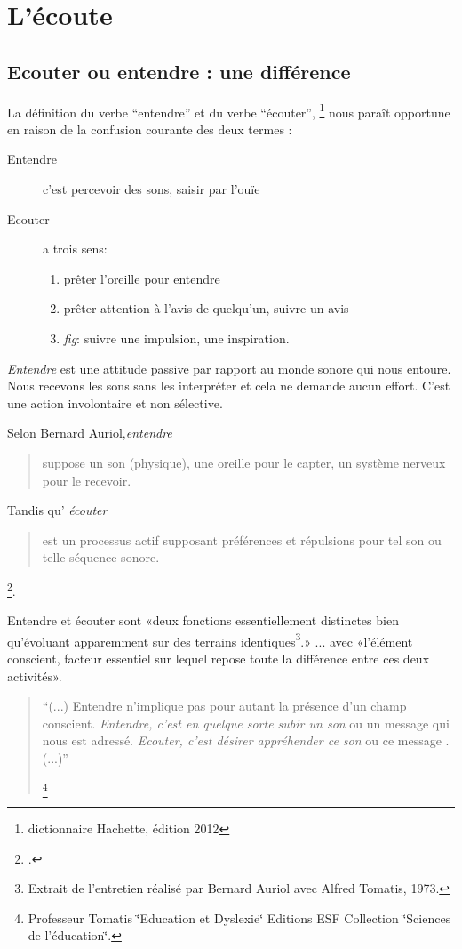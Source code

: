 \chapter{L'écoute}

\section{Ecouter ou entendre : une différence}

La définition du verbe ``entendre'' et du verbe ``écouter'', 
\footnote{dictionnaire Hachette, édition 2012 } nous paraît opportune %
en raison de la confusion courante des deux termes :
\begin{description}
\item[Entendre] c'est  percevoir des sons, saisir par l'ouïe
\item[Ecouter] a trois sens: 
\begin{enumerate}
	\item prêter l'oreille pour entendre
	\item prêter attention
	à l'avis de quelqu'un, suivre un avis
	\item \emph{fig}: suivre une impulsion,
	une inspiration.
\end{enumerate}
\end{description}



\emph{Entendre} est une attitude passive par rapport au monde sonore
qui nous entoure. Nous recevons les sons sans les interpréter et cela
ne demande aucun effort. C'est une action involontaire et non
sélective.

    Selon Bernard Auriol,\textit{entendre} \begin{quote}
	suppose un son (physique), une oreille
	pour le capter, un système nerveux pour le recevoir.
\end{quote} Tandis qu' \textit{écouter }\begin{quote}
	est un
	processus actif supposant préférences et répulsions pour tel son ou
	telle séquence sonore.
\end{quote}\footnote{\cite{Auri96:clesons}.}.

Entendre et écouter sont «deux
fonctions essentiellement distinctes bien qu'évoluant apparemment sur
des terrains identiques\footnote{Extrait de l'entretien réalisé par
	Bernard Auriol avec Alfred Tomatis, 1973.}.» ... avec «l'élément conscient, facteur essentiel sur lequel repose toute la
différence entre ces deux activités».
\begin{quote}
	``(...) Entendre n'implique pas pour autant la présence d'un champ
	conscient.\emph{ Entendre, c\textquoteright est en quelque sorte subir
		un son }ou un message qui nous est adressé. \emph{Ecouter, c'est désirer
		appréhender ce son }ou ce message . (...)'' 
	
	\footnote{Professeur Tomatis \char`\"{}Education et Dyslexie\char`\"{} Editions
		ESF Collection \char`\"{}Sciences de l'éducation\char`\"{}.}
\end{quote}


